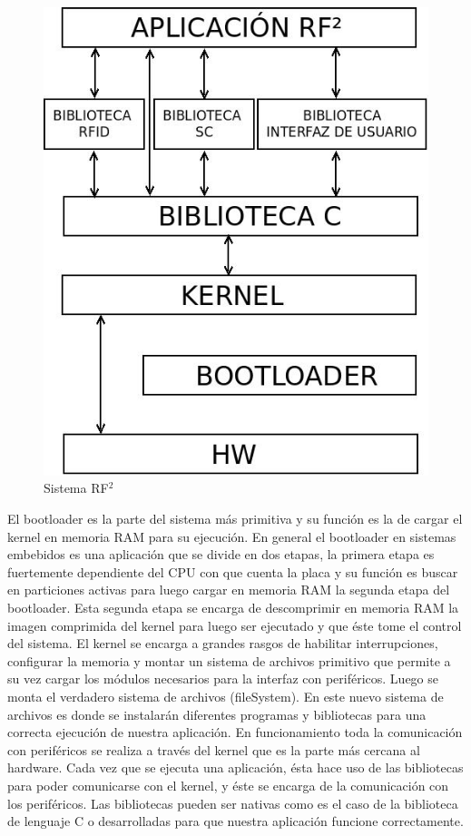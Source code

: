 \begin{figure}[H]
\centering
  \begin{center}
  \includegraphics[scale=.4]{Imagenes/SW.jpg} 
  \end{center}
  \caption{Sistema RF${^{2}}$}\label{Fig:SW} 
\end{figure}

El bootloader es la parte del sistema más primitiva y su función es la de cargar el
kernel en memoria RAM para su ejecución. En general el bootloader en sistemas embebidos
es una aplicación que se divide en dos etapas, la primera etapa es fuertemente dependiente
del CPU con que cuenta la placa y su función es buscar en particiones activas para luego cargar 
en memoria RAM la segunda etapa del bootloader. Esta segunda etapa se encarga de descomprimir
en memoria RAM la imagen comprimida del kernel para luego ser ejecutado y que éste tome el
control del sistema.
El kernel se encarga a grandes rasgos de habilitar interrupciones, configurar la memoria y montar un sistema de archivos primitivo que permite a su vez cargar los módulos necesarios para la interfaz con periféricos. Luego se monta el verdadero sistema de archivos (fileSystem). En este nuevo sistema de archivos es donde se instalarán diferentes programas y bibliotecas para una correcta ejecución de nuestra aplicación.
En funcionamiento toda la comunicación con periféricos se realiza a través del kernel que es la parte más cercana al hardware.
Cada vez que se ejecuta una aplicación, ésta hace uso de las bibliotecas para poder comunicarse con el kernel, y éste se encarga de la comunicación con los periféricos. Las bibliotecas pueden ser nativas como es el caso de la biblioteca de lenguaje C o desarrolladas para que nuestra aplicación funcione correctamente.


